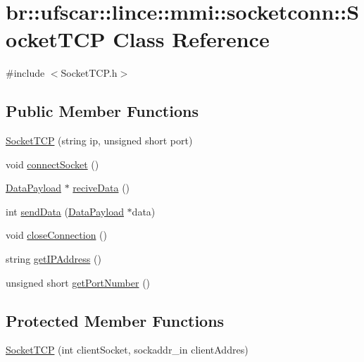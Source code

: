 \hypertarget{classbr_1_1ufscar_1_1lince_1_1mmi_1_1socketconn_1_1SocketTCP}{
\section{br::ufscar::lince::mmi::socketconn::SocketTCP Class Reference}
\label{classbr_1_1ufscar_1_1lince_1_1mmi_1_1socketconn_1_1SocketTCP}
}


{\ttfamily \#include $<$SocketTCP.h$>$}

\subsection*{Public Member Functions}
\begin{DoxyCompactItemize}
\item 
\hyperlink{classbr_1_1ufscar_1_1lince_1_1mmi_1_1socketconn_1_1SocketTCP_a98f391c314ca7210a8cdcfc666307540}{SocketTCP} (string ip, unsigned short port)
\item 
void \hyperlink{classbr_1_1ufscar_1_1lince_1_1mmi_1_1socketconn_1_1SocketTCP_a02b9574bbf468265f8781bd0ed2ea913}{connectSocket} ()
\item 
\hyperlink{classbr_1_1ufscar_1_1lince_1_1mmi_1_1socketconn_1_1DataPayload}{DataPayload} $\ast$ \hyperlink{classbr_1_1ufscar_1_1lince_1_1mmi_1_1socketconn_1_1SocketTCP_a2b577c784c4b34867851108230c5dedd}{reciveData} ()
\item 
int \hyperlink{classbr_1_1ufscar_1_1lince_1_1mmi_1_1socketconn_1_1SocketTCP_ae677b051d5e7a83bd0e3b7b947c5256b}{sendData} (\hyperlink{classbr_1_1ufscar_1_1lince_1_1mmi_1_1socketconn_1_1DataPayload}{DataPayload} $\ast$data)
\item 
void \hyperlink{classbr_1_1ufscar_1_1lince_1_1mmi_1_1socketconn_1_1SocketTCP_a109ecde95cef2c487193e5c256fef695}{closeConnection} ()
\item 
string \hyperlink{classbr_1_1ufscar_1_1lince_1_1mmi_1_1socketconn_1_1SocketTCP_a414912f61f221d793a2d9db8e919e2d5}{getIPAddress} ()
\item 
unsigned short \hyperlink{classbr_1_1ufscar_1_1lince_1_1mmi_1_1socketconn_1_1SocketTCP_a242631145b3bab7c7d6c08c5b76eb39a}{getPortNumber} ()
\end{DoxyCompactItemize}
\subsection*{Protected Member Functions}
\begin{DoxyCompactItemize}
\item 
\hyperlink{classbr_1_1ufscar_1_1lince_1_1mmi_1_1socketconn_1_1SocketTCP_a9df5b18236cbacc41a53d9d4fc320a8a}{SocketTCP} (int clientSocket, sockaddr\_\-in clientAddres)
\end{DoxyCompactItemize}
